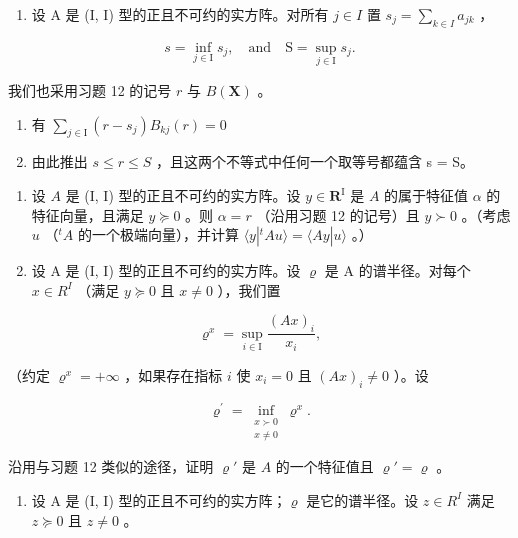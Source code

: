 \begin{enumerate}
\def\labelenumi{\arabic{enumi})}
\setcounter{enumi}{15}
\tightlist
\item
  设 A 是 (I, I) 型的正且不可约的实方阵。对所有 \(j \in I\) 置 \(s_{j} = \sum_{k \in I} a_{jk}\) ，
\end{enumerate}

\[
s = \inf _ {j \in \mathrm{I}} s _ {j}, \quad \text {and} \quad \mathrm{S} = \sup _ {j \in \mathrm{I}} s _ {j}.
\]

我们也采用习题 12 的记号 \(r\) 与 \(B(\mathbf{X})\) 。

\begin{enumerate}
\def\labelenumi{\alph{enumi})}
\item
  有 \(\sum_{j\in \mathrm{I}}(r - s_j)B_{kj}(r) = 0\)
\item
  由此推出 \(s \leqslant r \leqslant S\) ，且这两个不等式中任何一个取等号都蕴含 s = S。
\end{enumerate}

\begin{enumerate}
\def\labelenumi{\arabic{enumi})}
\setcounter{enumi}{16}
\item
  设 \(A\) 是 (I, I) 型的正且不可约的实方阵。设 \(y \in \mathbf{R}^{\mathrm{I}}\) 是 \(A\) 的属于特征值 \(\alpha\) 的特征向量，且满足 \(y \succcurlyeq 0\) 。则 \(\alpha = r\) （沿用习题 12 的记号）且 \(y \succ 0\) 。（考虑 \(u\) （\(^{t}A\) 的一个极端向量），并计算 \(\langle y|^{t}Au\rangle = \langle Ay|u\rangle\) 。）
\item
  设 A 是 (I, I) 型的正且不可约的实方阵。设 \(\varrho\) 是 A 的谱半径。对每个 \(x \in R^{I}\) （满足 \(y \succcurlyeq 0\) 且 \(x \neq 0\) ），我们置
\end{enumerate}

\[
\varrho^ {x} = \sup _ {i \in \mathrm{I}} \frac {(A x) _ {i}}{x _ {i}},
\]

（约定 \(\varrho^x = +\infty\) ，如果存在指标 \(i\) 使 \(x_i = 0\) 且 \((Ax)_i \neq 0\) ）。设

\[
\varrho^{\prime} = \inf_{\substack{x\succ 0\\ x\neq 0}}\varrho^{x}.
\]

沿用与习题 12 类似的途径，证明 \(\varrho'\) 是 \(A\) 的一个特征值且 \(\varrho' = \varrho\) 。

\begin{enumerate}
\def\labelenumi{\arabic{enumi})}
\setcounter{enumi}{18}
\tightlist
\item
  设 A 是 (I, I) 型的正且不可约的实方阵；\(\varrho\) 是它的谱半径。设 \(z \in R^{I}\) 满足 \(z \succcurlyeq 0\) 且 \(z \neq 0\) 。
\end{enumerate}

